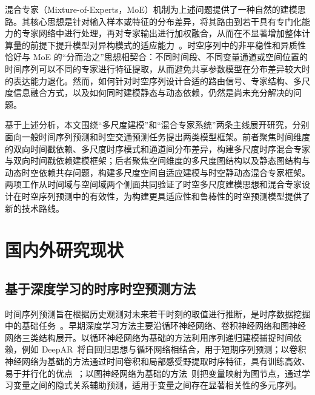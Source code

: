 混合专家（Mixture-of-Experts，MoE）机制为上述问题提供了一种自然的建模思路。其核心思想是针对输入样本或特征的分布差异，将其路由到若干具有专门化能力的专家网络中进行处理，再对专家输出进行加权融合，从而在不显著增加整体计算量的前提下提升模型对异构模式的适应能力~\cite{moe,moe-survey}。时空序列中的非平稳性和异质性恰好与 MoE 的“分而治之”思想相契合：不同时间段、不同变量通道或空间位置的时间序列可以不同的专家进行特征提取，从而避免共享参数模型在分布差异较大时的表达能力退化。然而，如何针对时空序列设计合适的路由信号、专家结构、多尺度信息融合方式，以及如何同时建模静态与动态依赖，仍然是尚未充分解决的问题。

基于上述分析，本文围绕“多尺度建模”和“混合专家系统”两条主线展开研究，分别面向一般时间序列预测和时空交通预测任务提出两类模型框架。前者聚焦时间维度的双向时间戳依赖、多尺度时序模式和通道间分布差异，构建多尺度时序混合专家与双向时间戳依赖建模框架；后者聚焦空间维度的多尺度图结构以及静态图结构与动态时空依赖共存问题，构建多尺度空间自适应建模与时空静动态混合专家框架。两项工作从时间域与空间域两个侧面共同验证了时空多尺度建模思想和混合专家设计在时空序列预测中的有效性，为构建更具适应性和鲁棒性的时空预测模型提供了新的技术路线。

\section{国内外研究现状}
\label{sec:currentWork}
\subsection{基于深度学习的时序时空预测方法}

时间序列预测旨在根据历史观测对未来若干时刻的取值进行推断，是时序数据挖掘中的基础任务~\cite{kim2024comprehensive,wen2023transformers,tkde-dist}。早期深度学习方法主要沿循环神经网络、卷积神经网络和图神经网络三类结构展开。以循环神经网络为基础的方法利用序列递归建模捕捉时间依赖，例如 DeepAR~\cite{deepar}将自回归思想与循环网络相结合，用于短期序列预测；以卷积神经网络为基础的方法通过时间卷积和局部感受野提取时序特征，具有训练高效、易于并行化的优点~\cite{micn,cnn_related1}；以图神经网络为基础的方法~\cite{tkde-vars, gnn4ts-survey, tkde-star, zheng2025multi}则把变量映射为图节点，通过学习变量之间的隐式关系辅助预测，适用于变量之间存在显著相关性的多元序列。

